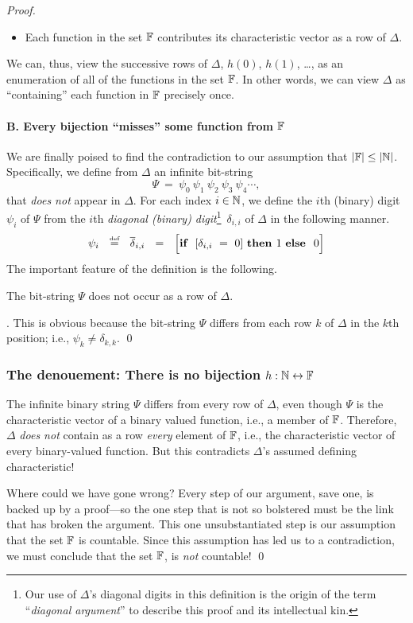 \begin{proof}
\begin{itemize}
\item
Each function in the set $\mathbb{F}$ contributes its characteristic vector as a row of $\Delta$.
\end{itemize}
We can, thus, view the successive rows of $\Delta$, $h(0)$, $h(1)$, \ldots, as an enumeration of all of the functions in the set $\mathbb{F}$.  In other words, we can view $\Delta$ as ``containing'' each function in $\mathbb{F}$ precisely once.

\paragraph{B. Every bijection ``misses'' some function from $\mathbb{F}$}

We are finally poised to find the contradiction to our assumption that $|\mathbb{F}| \leq |\mathbb{N}|$.  Specifically, we define from $\Delta$ an infinite bit-string
\[ \Psi \ = \ \psi_0 \ \psi_1 \ \psi_2 \ \psi_3 \ \psi_4 \cdots, \]
that {\em does not} appear in $\Delta$.  For each index $i \in \mathbb{N}$, we define the $i$th (binary) digit $\psi_i$ of $\Psi$ from the $i$th {\em diagonal (binary) digit}\footnote{Our use of $\Delta$'s diagonal digits in this definition is the origin of the term ``{\em diagonal argument}'' to describe this proof and its intellectual kin.}~$\delta_{i,i}$ of $\Delta$ in the following manner.
\[ \psi_i \ \ \eqdef \ \ \overline{\delta}_{i,i} \ \ = \ \
\Big[\mbox{\bf if } \ [\delta_{i,i} \ = \ 0] \ \mbox{\bf then } 1 \ \mbox{\bf else } \ 0 \Big]
\]
The important feature of the definition is the following.

\begin{lemma}
\label{lem:PSI-notin-DELTA}
The bit-string $\Psi$ does not occur as a row of $\Delta$.
\end{lemma}

.
This is obvious because the bit-string $\Psi$ differs from each row $k$ of $\Delta$ in the $k$th position; i.e., $\psi_k \neq \delta_{k,k}$.  \qed

\subsubsection{The denouement: There is no bijection  $h: \mathbb{N} \leftrightarrow \mathbb{F}$}

The infinite binary string $\Psi$ differs from every row of $\Delta$, even though $\Psi$ is the characteristic vector of a binary valued function, i.e., a member of $\mathbb{F}$.  Therefore, $\Delta$ {\em does not} contain as a row {\em every} element of $\mathbb{F}$, i.e., the characteristic vector of every binary-valued function.  But this contradicts $\Delta$'s assumed defining characteristic!

\smallskip

Where could we have gone wrong?  Every step of our argument, save one, is backed up by a proof---so the one step that is not so bolstered must be the link that has broken the argument.  This one unsubstantiated step is our assumption that the set $\mathbb{F}$ is countable. Since this assumption has led us to a contradiction, we must conclude that the set $\mathbb{F}$, is {\em not} countable!  \qed
\end{proof}

